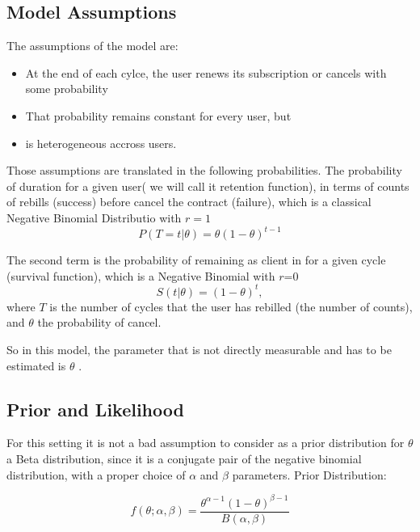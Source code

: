 \documentclass[paper=a4, fontsize=11pt]{scrartcl} %
\numberwithin{equation}{section} %
\numberwithin{figure}{section} %
\numberwithin{table}{section} %
\begin{document}
	\subsection{Model Assumptions} 
	The assumptions of the model are:
	\begin{itemize}
		\item At the end of each cylce, the user renews its subscription or cancels with some probability
		\item That probability remains constant for every user, but
		\item is heterogeneous accross users.
	\end{itemize}
	
	Those assumptions are translated in the following probabilities. The probability of duration for a given user( we will call it retention function), in terms of counts of rebills (success) before cancel the contract (failure), which is a classical Negative Binomial Distributio with $r=1$\\
	\begin{equation} \label{eq1}
	P(T=t | \theta) = \theta (1-\theta)^{t-1}
	\end{equation}
	
	The second term is the probability of remaining as client in for a given cycle (survival function), which is a Negative Binomial with $r$=0\\
	\begin{equation} \label{eq2}
	S(t | \theta) = (1-\theta)^t,
	\end{equation}
	where $T$ is the number of cycles that the user has rebilled (the number of counts), and $\theta$ the probability of cancel.
	
	So in this model, the parameter that is not directly measurable and has to be estimated is $\theta$
	. 
	\subsection{Prior and Likelihood} 
	For this setting it is not a bad assumption to consider as a prior distribution for $\theta$ a Beta distribution, since it is a conjugate pair of the negative binomial distribution, with a proper choice of $\alpha$ and $\beta$ parameters. Prior Distribution:
	
	\begin{equation} \label{eq3}
	f(\theta; \alpha, \beta) = \frac{\theta^{\alpha-1}(1-\theta)^{\beta-1}}{B(\alpha,\beta)}
	\end{equation}
	
\end{document}
